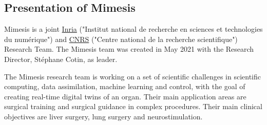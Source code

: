 \subsection{Presentation of Mimesis}

Mimesis is a joint \href{https://www.inria.fr/fr}{Inria} ("Institut national de recherche en sciences et technologies du numérique") and \href{https://www.cnrs.fr/fr}{CNRS} ("Centre national de la recherche scientifique") Research Team. The Mimesis team was created in May 2021 with the Research Director, Stéphane Cotin, as leader.

The Mimesis research team is working on a set of scientific challenges in scientific computing, data assimilation, machine learning and control, with the goal of creating real-time digital twins of an organ. Their main application areas are surgical training and surgical guidance in complex procedures. Their main clinical objectives are liver surgery, lung surgery and neurostimulation.



%

